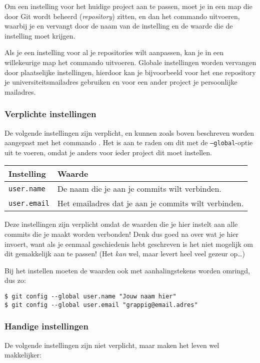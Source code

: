 Om een instelling voor het huidige project aan te passen, moet je in een map die
door Git wordt beheerd (\emph{repository}) zitten, en dan het commando  uitvoeren, waarbij je  en
 vervangt door de naam van de instelling en de waarde die de
instelling moet krijgen.

Als je een instelling voor al je repositories wilt aanpassen, kan je in een
willekeurige map het commando 
uitvoeren. Globale instellingen worden vervangen door plaatselijke instellingen,
hierdoor kan je bijvoorbeeld voor het ene repository je universiteitsmailadres
gebruiken en voor een ander project je persoonlijke mailadres.

\subsubsection{Verplichte instellingen}
De volgende instellingen zijn verplicht, en kunnen zoals boven beschreven worden
aangepast met het commando . Het is aan te raden om dit met de
\texttt{--global}-optie uit te voeren, omdat je anders voor ieder project dit
moet instellen.

\begin{center}
\begin{tabular}{ll}
	\textbf{Instelling}	& \textbf{Waarde} \\ \hline
	\texttt{user.name} & De naam die je aan je commits wilt verbinden.\\
	\texttt{user.email} & Het emailadres dat je aan je commits wilt verbinden.
\end{tabular}
\end{center}

Deze instellingen zijn verplicht omdat de waarden die je hier instelt aan alle
commits die je maakt worden verbonden! Denk dus goed na over wat je hier
invoert, want als je eenmaal geschiedenis hebt geschreven is het niet mogelijk
om dit gemakkelijk aan te passen! (Het \emph{kan} wel, maar levert heel veel
gezeur op\ldots)

Bij het instellen moeten de waarden ook met aanhalingstekens worden omringd, dus
zo:
\begin{verbatim}
$ git config --global user.name "Jouw naam hier"
$ git config --global user.email "grappig@email.adres"
\end{verbatim}

\subsubsection{Handige instellingen}
De volgende instellingen zijn niet verplicht, maar maken het leven wel
makkelijker:

